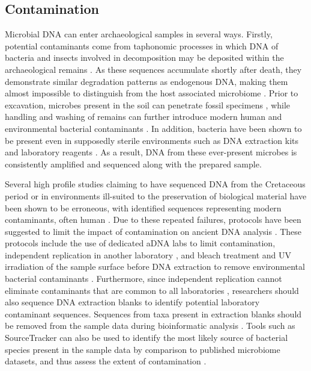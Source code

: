 \documentclass[12pt, a4paper]{article}
\begin{document}
\subsection{Contamination}\label{sec:contamination}
Microbial DNA can enter archaeological samples in several ways. 
Firstly, potential contaminants come from \gls{taphonomic} processes in which DNA of bacteria and insects involved in decomposition may be deposited within the archaeological remains \cite{Noonan:2005aa,Poinar:2006aa}. 
As these sequences accumulate shortly after death, they demonstrate similar degradation patterns as endogenous DNA, making them almost impossible to distinguish from the host associated microbiome \cite{Herbig2016}. 
Prior to excavation, microbes present in the soil can penetrate fossil specimens \cite{Noonan:2005aa}, while handling and washing of remains can further introduce modern human and environmental bacterial contaminants \cite{Pruvost:2007aa}. 
In addition, bacteria have been shown to be present even in supposedly sterile environments such as DNA extraction kits and laboratory reagents \cite{Salter:2014}. 
As a result, DNA from these ever-present microbes is consistently amplified and sequenced along with the prepared sample. 

Several high profile studies claiming to have sequenced DNA from the Cretaceous period \cite{Woodward:1994aa} or in environments ill-suited to the preservation of biological material \cite{Paabo:1985aa} have been shown to be erroneous, with identified sequences representing modern contaminants, often human \cite{Cooper:2000aa,Rizzi:2012aa}. 
Due to these repeated failures, protocols have been suggested to limit the impact of contamination on ancient DNA analysis \cite{Weyrich:2015aa,Cooper:2000aa}. 
These protocols include the use of dedicated aDNA labs to limit contamination, independent replication in another laboratory \cite{Cooper:2000aa}, and bleach treatment and UV irradiation of the sample surface before DNA extraction to remove environmental bacterial contaminants .
Furthermore, since independent replication cannot eliminate contaminants that are common to all laboratories \cite{Garcia-Garcera:2011aa}, researchers should also sequence DNA extraction blanks to identify potential laboratory contaminant sequences. Sequences from taxa present in extraction blanks should be removed from the sample data during bioinformatic analysis . 
Tools such as SourceTracker \cite{Knights:2011aa} can also be used to identify the most likely source of bacterial species present in the sample data by comparison to published microbiome datasets, and thus assess the extent of contamination . 
\end{document}
